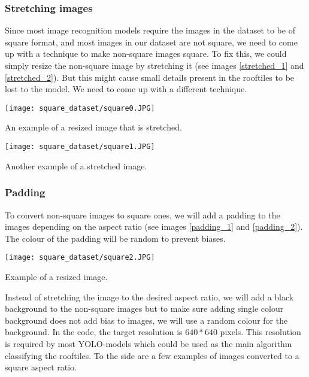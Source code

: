 \subsubsection{Stretching images}
Since most image recognition models require the images in the dataset to be of square format, and most images in our dataset are not square, we need to come up with a technique to make non-square images square. 
To fix this, we could simply resize the non-square image by stretching it (see images \ref{stretched_1} and \ref{stretched_2}). But this might cause small details present in the rooftiles to be lost to the model. We need to come up with a different technique.
\begin{marginfigure} %
	\texttt{[image: square\_dataset/square0.JPG]}
	\caption{An example of a resized image that is stretched.}
	\label{stretched_1}
\end{marginfigure}

\begin{marginfigure} %
	\texttt{[image: square\_dataset/square1.JPG]}
	\caption{Another example of a stretched image.}
	\label{stretched_2}
\end{marginfigure}

\subsubsection{Padding}
To convert non-square images to square ones, we will add a padding to the images depending on the aspect ratio (see images \ref{padding_1} and \ref{padding_2}). The colour of the padding will be random to prevent biases.

\begin{marginfigure} %
	\texttt{[image: square\_dataset/square2.JPG]}
	\caption{Example of a resized image.}
	\label{padding_1}
\end{marginfigure}

Instead of stretching the image to the desired aspect ratio, we will add a black background to the non-square images but to make sure adding single colour background does not add bias to images, we will use a random colour for the background. 
In the code, the target resolution is $640*640$ pixels. This resolution is required by most YOLO-models which could be used as the main algorithm classifying the rooftiles. 
To the side are a few examples of images converted to a square aspect ratio.


